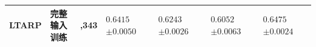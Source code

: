 \begin{table}[H]
\begin{tabularx}{\textwidth}{@{}>{\raggedright\arraybackslash}p{2.0cm}>{\centering\arraybackslash}p{2.5cm}>{\centering\arraybackslash}p{2.1cm}*{4}{>{\centering\arraybackslash}X}@{}}
\addlinespace\midrule
LTARP & \shortstack{完整输入\\训练} & 164,343 & \shortstack{$0.6415$\\$\pm0.0050$} & \shortstack{$0.6243$\\$\pm0.0026$} & \shortstack{$0.6052$\\$\pm0.0063$} & \shortstack{$0.6475$\\$\pm0.0024$}\\
\bottomrule
\end{tabularx}
\end{table}